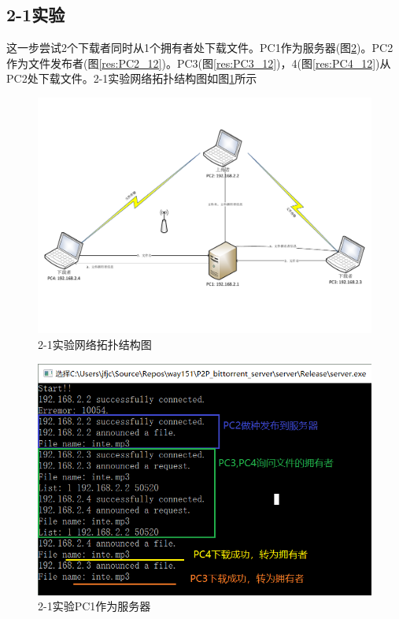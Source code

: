 \documentclass[thesis]{thesis}
\begin{document}
	\subsection{2-1实验}
	这一步尝试2个下载者同时从1个拥有者处下载文件。PC1作为服务器(图\ref{res:PC1_12})。PC2作为文件发布者(图\ref{res:PC2_12})。PC3(图\ref{res:PC3_12})，4(图\ref{res:PC4_12})从PC2处下载文件。2-1实验网络拓扑结构图如图\ref{res:21}所示
	\begin{figure}[H]
		\centering 
		\includegraphics[width=0.6\linewidth]{fig/2-1.pdf}
		\caption{2-1实验\quad 网络拓扑结构图}
		\label{res:21}
	\end{figure}
	\begin{minipage}{0.5\linewidth}
	\begin{figure}[H]
		\centering
		\includegraphics[width=\linewidth]{fig/PC1_12.png}
		\caption{2-1实验\quad PC1作为服务器}
		\label{res:PC1_12}
	\end{figure}
	\end{minipage}
\end{document}
